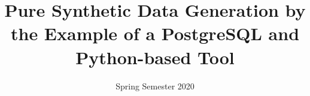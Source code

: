 \title  {Pure Synthetic Data Generation by the Example of a PostgreSQL and Python-based Tool}
\addresses  {\groupname\\\deptname\\\univname} 
\date       {Spring Semester 2020}

\maketitle